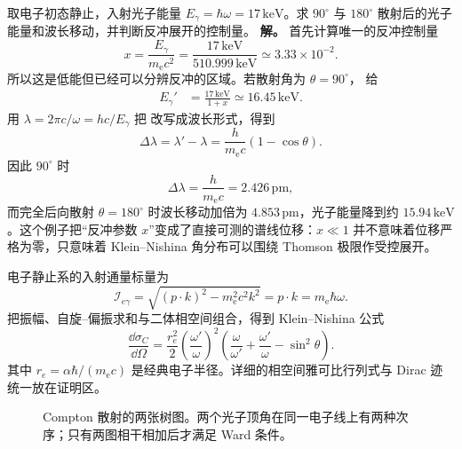 \begin{exbox}
取电子初态静止，入射光子能量 $E_\gamma=\hbar\omega=17\,\mathrm{keV}$。求 $90^\circ$ 与 $180^\circ$ 散射后的光子能量和波长移动，并判断反冲展开的控制量。
\textbf{解。} 首先计算唯一的反冲控制量
\begin{equation*}
 x=\frac{E_\gamma}{m_{\mathrm e} c^2}
 =\frac{17\,\mathrm{keV}}{510.999\,\mathrm{keV}}
 \simeq 3.33\times10^{-2}.
\end{equation*}
所以这是低能但已经可以分辨反冲的区域。若散射角为 $\theta=90^\circ$， 给
\begin{align*}
 E_\gamma'
 &=\frac{17\,\mathrm{keV}}{1+x}
 \simeq16.45\,\mathrm{keV}.
\end{align*}
用 $\lambda=2\pi c/\omega=h c/E_\gamma$ 把 改写成波长形式，得到
\begin{equation}
 {
 \Delta\lambda
 =\lambda'-\lambda
 =\frac{h}{m_{\mathrm e} c}(1-\cos\theta).}
 \label{eq:compton-wavelength-shift-dp61}
\end{equation}
因此 $90^\circ$ 时
\begin{equation*}
 \Delta\lambda=\frac{h}{m_{\mathrm e} c}=2.426\,\mathrm{pm},
\end{equation*}
而完全后向散射 $\theta=180^\circ$ 时波长移动加倍为 $4.853\,\mathrm{pm}$，光子能量降到约 $15.94\,\mathrm{keV}$。这个例子把“反冲参数 $x$”变成了直接可测的谱线位移：$x\ll1$ 并不意味着位移严格为零，只意味着 Klein--Nishina 角分布可以围绕 Thomson 极限作受控展开。
\end{exbox}

电子静止系的入射通量标量为
\begin{equation}
 \mathcal I_{e\gamma}
 =\sqrt{(p\!\cdot k)^2-m_{\mathrm e}^2c^2k^2}
 =p\!\cdot k
 =m_{\mathrm e}\hbar\omega.
 \label{eq:compton-invariant-flux-r14}
\end{equation}
把振幅、自旋--偏振求和与二体相空间组合，得到 Klein--Nishina 公式
\begin{equation}
 {
 \frac{\dd\sigma_C}{\dd\Omega}
 =\frac{r_e^2}{2}
 \left(\frac{\omega'}{\omega}\right)^2
 \left(
 \frac\omega{\omega'}+\frac{\omega'}\omega-\sin^2\theta
 \right).}
 \label{eq:klein-nishina-SI}
\end{equation}
其中 \(r_e=\alpha\hbar/(m_{\mathrm e} c)\) 是经典电子半径。详细的相空间雅可比行列式与 Dirac 迹统一放在证明区。

\begin{figure}[htbp]
 \centering
 
 \caption{Compton 散射的两张树图。两个光子顶角在同一电子线上有两种次序；只有两图相干相加后才满足 Ward 条件。}
 \label{fig:compton-two}
\end{figure}

